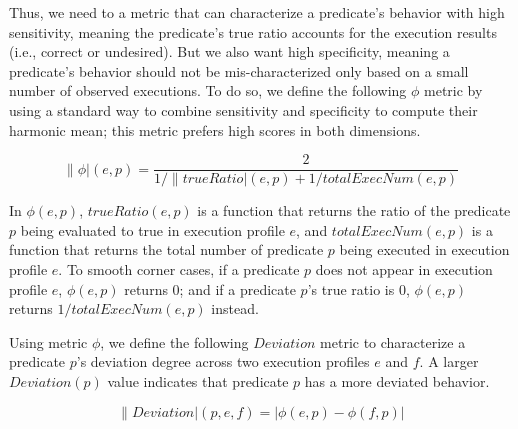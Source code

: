 
Thus, we need to a metric that can characterize
a predicate's behavior with high sensitivity, meaning the predicate's true
ratio accounts for the execution results (i.e., correct or undesired).
But we also want
high specificity, meaning a predicate's behavior should not be
mis-characterized only based on a small number of
observed executions. To do so, we define the following
$\phi$ metric by using a standard way to
combine sensitivity and specificity to compute their
harmonic mean; this metric prefers high scores in both dimensions. 

\vspace{-3mm}

{\small{
\[
\|\phi|(e, p) = \frac{2}{{1}/{\|trueRatio|(e, p)} + {1}/{totalExecNum(e, p)}}
\]
}}

\vspace{-3mm}

In $\phi(e, p)$, $trueRatio(e, p)$ is a function that returns the ratio of the predicate $p$ being
evaluated to true in execution profile $e$, and $totalExecNum(e, p)$ is a function
that returns the total number of predicate $p$ being executed in execution profile $e$.
To smooth corner cases, if a predicate $p$ does not appear in execution profile $e$, 
$\phi(e, p)$ returns 0; and if a predicate $p$'s true ratio is 0, $\phi(e, p)$ returns
$1/totalExecNum(e, p)$ instead.


Using metric $\phi$, we define the following $Deviation$ metric
to characterize a predicate $p$'s deviation degree across two execution
profiles $e$ and $f$. A larger $Deviation(p)$ value indicates that
predicate $p$ has a more deviated behavior. %

\vspace{-2mm}

{\small{
\[
\|Deviation|(p, e, f) = |\phi(e, p) - \phi(f, p)|
\]
}}
\vspace{-4mm}

